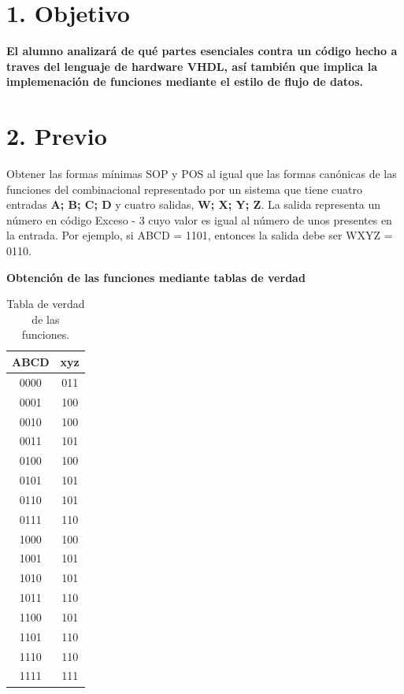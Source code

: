 \documentclass[letterpaper]{article} %
\begin{document}
    \section*{1. Objetivo}

    \textbf{El alumno analizar\'a de qu\'e partes esenciales contra un c\'odigo hecho
    a traves del lenguaje de hardware VHDL, as\'i tambi\'en que implica la implemenaci\'on
    de funciones mediante el estilo de flujo de datos.}


    \section*{2. Previo}

    Obtener las formas m\'inimas SOP y POS al igual que las formas can\'onicas de las funciones del
    combinacional representado por un sistema que tiene cuatro entradas \textbf{A; B; C; D} y 
    cuatro salidas, \textbf{W; X; Y; Z}. La salida representa un n\'umero en c\'odigo Exceso - 3 cuyo
    valor es igual al n\'umero de unos presentes en la entrada. Por ejemplo, si
    ABCD = 1101, entonces la salida debe ser WXYZ = 0110.

    \vspace{0.5cm}

    \textbf{Obtenci\'on de las funciones mediante tablas de verdad}

    \vspace{0.5cm}

    \begin{table}[H]
        \begin{center}
            \begin{tabular}{| c | c |}
                \hline
                ABCD & xyz \\ \hline
                0000 & 011 \\
                0001 & 100 \\
                0010 & 100 \\
                0011 & 101 \\
                0100 & 100 \\
                0101 & 101 \\
                0110 & 101 \\
                0111 & 110 \\
                1000 & 100 \\
                1001 & 101 \\
                1010 & 101 \\
                1011 & 110 \\
                1100 & 101 \\
                1101 & 110 \\
                1110 & 110 \\
                1111 & 111 \\ \hline
                \end{tabular}
                \caption{Tabla de verdad de las funciones.}
                \label{tab:verdad}
            \end{center}
    \end{table}
\end{document}
